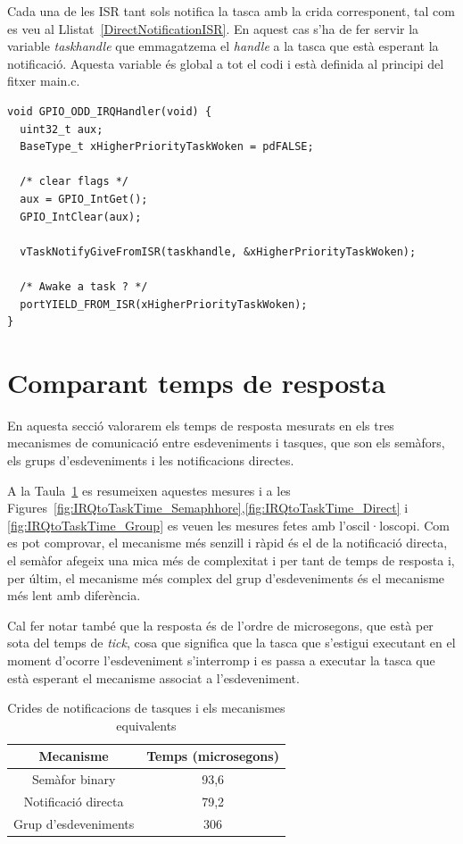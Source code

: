 Cada una de les ISR tant sols notifica la tasca amb la crida corresponent, tal com es veu al Llistat~\ref{DirectNotificationISR}. En aquest cas s'ha de fer servir la variable {\em taskhandle} que emmagatzema el {\em handle} a la tasca que està esperant la notificació. Aquesta variable és global a tot el codi i està definida al principi del fitxer main.c.

\begin{lstlisting}[style=customc,caption={Tasca que espera la notificació}, label=DirectNotificationISR]
void GPIO_ODD_IRQHandler(void) {
  uint32_t aux;
  BaseType_t xHigherPriorityTaskWoken = pdFALSE;

  /* clear flags */
  aux = GPIO_IntGet();
  GPIO_IntClear(aux);

  vTaskNotifyGiveFromISR(taskhandle, &xHigherPriorityTaskWoken);
  
  /* Awake a task ? */
  portYIELD_FROM_ISR(xHigherPriorityTaskWoken);
}
\end{lstlisting}

\section{Comparant temps de resposta}
En aquesta secció valorarem els temps de resposta mesurats en els tres mecanismes de comunicació entre esdeveniments i tasques, que son els semàfors, els grups d'esdeveniments i les notificacions directes.

A la Taula~\ref{tb:IRQtoTaskTime} es resumeixen aquestes mesures i a les Figures~\ref{fig:IRQtoTaskTime_Semaphhore},\ref{fig:IRQtoTaskTime_Direct} i \ref{fig:IRQtoTaskTime_Group} es veuen les mesures fetes amb l'oscil·loscopi. Com es pot comprovar, el mecanisme més senzill i ràpid és el de la notificació directa, el semàfor afegeix una mica més de complexitat i per tant de temps de resposta i, per últim, el mecanisme més complex del grup d'esdeveniments és el mecanisme més lent amb diferència.

Cal fer notar també que la resposta és de l'ordre de microsegons, que està per sota del temps de {\em  tick}, cosa que significa que la tasca que s'estigui executant en el moment d'ocorre l'esdeveniment s'interromp i es passa a executar la tasca que està esperant el mecanisme associat a l'esdeveniment.

\begin{table}
\caption{Crides de notificacions de tasques i els mecanismes equivalents }
\centering
\begin{tabular}{|c|c|}
\hline
 Mecanisme & Temps (microsegons) \\
\hline
 Semàfor binary & 93,6 \\
\hline
Notificació directa & 79,2  \\
\hline
Grup d'esdeveniments & 306 \\
\hline
\end{tabular}
\label{tb:IRQtoTaskTime}
\end{table}


